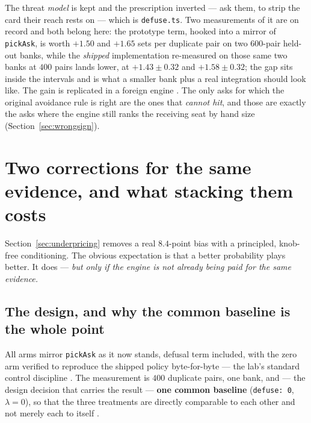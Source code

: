 \documentclass[11pt]{article}
\newcommand{\code}[1]{\texttt{#1}}
\begin{document}
The threat \emph{model} is kept and the prescription inverted --- ask them, to strip the
card their reach rests on --- which is \code{defuse.ts}. Two measurements of it are on
record and both belong here: the prototype term, hooked into a mirror of \code{pickAsk},
is worth $+1.50$ and $+1.65$ sets per duplicate pair on two $600$-pair held-out banks,
while the \emph{shipped} implementation re-measured on those same two banks at $400$ pairs
lands lower, at $+1.43 \pm 0.32$ and $+1.58 \pm 0.32$; the gap sits inside the intervals
and is what a smaller bank plus a real integration should look like. The gain is
replicated in a foreign engine \cite{concession,crossplay}. The only asks for which the
original avoidance rule is right
are the ones that \emph{cannot hit}, and those are exactly the asks where the engine still
ranks the receiving seat by hand size (Section~\ref{sec:wrongsign}).

\section{Two corrections for the same evidence, and what stacking them costs}
\label{sec:substitution}

Section~\ref{sec:underpricing} removes a real $8.4$-point bias with a principled,
knob-free conditioning. The obvious expectation is that a better probability plays better.
It does --- \emph{but only if the engine is not already being paid for the same evidence.}

\subsection{The design, and why the common baseline is the whole point}
\label{sec:commonbaseline}

All arms mirror \code{pickAsk} as it now stands, defusal term included, with the zero arm
verified to reproduce the shipped policy byte-for-byte --- the lab's standard control
discipline \cite{botlab,v05paper}. The measurement is $400$ duplicate pairs, one bank,
and --- the design decision that carries the result --- \textbf{one common baseline}
(\mbox{\code{defuse: 0}}, $\lambda = 0$), so that the three treatments are directly comparable to
each other and not merely each to itself \cite{asking}.
\end{document}
